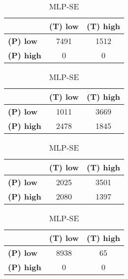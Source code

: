 \begin{landscape}
\begin{table}[htbp]
\begin{minipage}{.3\textwidth}
\begin{tabular}{|l|c|c|}
\hline
					& \textbf{(T) low}	& \textbf{(T) high}	\\ \hline
\textbf{(P) low}	& 7491				& 1512				\\ \hline
\textbf{(P) high}	& 0					& 0					\\ \hline
\end{tabular}
\end{minipage}\hfill
\begin{minipage}{.3\textwidth}
\tiny
\caption*{MLP-AT}
\begin{tabular}{|l|c|c|}
\hline
					& \textbf{(T) low}	& \textbf{(T) high}	\\ \hline
\textbf{(P) low}	& 1011				& 3669				\\ \hline
\textbf{(P) high}	& 2478				& 1845				\\ \hline
\end{tabular}
\end{minipage}\hfill
\begin{minipage}{.3\textwidth}
\tiny
\caption*{MLP-PL}
\begin{tabular}{|l|c|c|}
\hline
					& \textbf{(T) low}	& \textbf{(T) high}	\\ \hline
\textbf{(P) low}	& 2025				& 3501				\\ \hline
\textbf{(P) high}	& 2080				& 1397				\\ \hline
\end{tabular}
\end{minipage}\hfill
\begin{minipage}{.3\textwidth}
\tiny
\caption*{MLP-SE}
\begin{tabular}{|l|c|c|}
\hline
					& \textbf{(T) low}	& \textbf{(T) high}	\\ \hline
\textbf{(P) low}	& 8938				& 65				\\ \hline
\textbf{(P) high}	& 0					& 0					\\ \hline
\end{tabular}
\end{minipage}\hfill
\end{table}
\end{landscape}